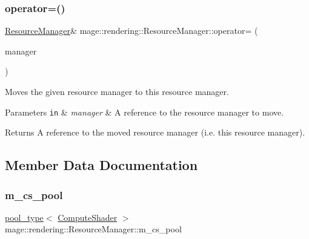 \subsubsection{\texorpdfstring{operator=()}{operator=()}\hspace{0.1cm}{\footnotesize\ttfamily [2/2]}}
{\footnotesize\ttfamily \mbox{\hyperlink{classmage_1_1rendering_1_1_resource_manager}{Resource\+Manager}}\& mage\+::rendering\+::\+Resource\+Manager\+::operator= (\begin{DoxyParamCaption}\item[{\mbox{\hyperlink{classmage_1_1rendering_1_1_resource_manager}{Resource\+Manager}} \&\&}]{manager }\end{DoxyParamCaption})\hspace{0.3cm}{\ttfamily [delete]}}

Moves the given resource manager to this resource manager.


\begin{DoxyParams}[1]{Parameters}
\mbox{\tt in}  & {\em manager} & A reference to the resource manager to move. \\
\hline
\end{DoxyParams}
\begin{DoxyReturn}{Returns}
A reference to the moved resource manager (i.\+e. this resource manager). 
\end{DoxyReturn}


\subsection{Member Data Documentation}
\mbox{\label{classmage_1_1rendering_1_1_resource_manager_ae0433b0866f523c3c0e6e22197aea86f}} 
\subsubsection{\texorpdfstring{m\+\_\+cs\+\_\+pool}{m\_cs\_pool}}
{\footnotesize\ttfamily \mbox{\hyperlink{classmage_1_1rendering_1_1_resource_manager_ab21a4e280087032ee533f267bd9bf602}{pool\+\_\+type}}$<$ \mbox{\hyperlink{namespacemage_1_1rendering_aa67e55ba4dca44d39b0367b31f091863}{Compute\+Shader}} $>$ mage\+::rendering\+::\+Resource\+Manager\+::m\+\_\+cs\+\_\+pool\hspace{0.3cm}{\ttfamily [private]}}

